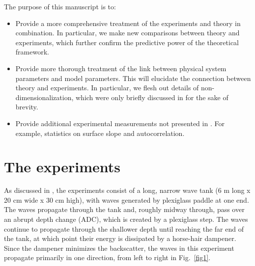\documentclass[11pt]{article}
\newcommand{\vsp}[1]{\vspace{#1 pc} \noindent}
\begin{document}
\vsp{4}


The purpose of this manuscript is to:
\begin{itemize}
\item Provide a more comprehensive treatment of the experiments and theory in combination. In particular, we make new comparisons between theory and experiments, which further confirm the predictive power of the theoretical framework.
\item Provide more thorough treatment of the link between physical system parameters and model parameters. This will elucidate the connection between theory and experiments. In particular, we flesh out details of non-dimensionalization, which were only briefly discussed in \cite{majda2019statistical} for the sake of brevity.
\item Provide additional experimental measurements not presented in \cite{bolles2019anomalous}. For example, statistics on surface slope and autocorrelation.
\end{itemize}

\section{The experiments}

	As discussed in \cite{bolles2019anomalous}, the experiments consist of a long, narrow wave tank (6 m long x 20 cm wide x 30 cm high), with waves generated by plexiglass paddle at one end. The waves propagate through the tank and, roughly midway through, pass over an abrupt depth change (ADC), which is created by a plexiglass step. The waves continue to propagate through the shallower depth until reaching the far end of the tank, at which point their energy is dissipated by a horse-hair dampener. Since the dampener minimizes the backscatter, the waves in this experiment propagate primarily in one direction, from left to right in Fig.~\ref{fig1}. 
\end{document}
